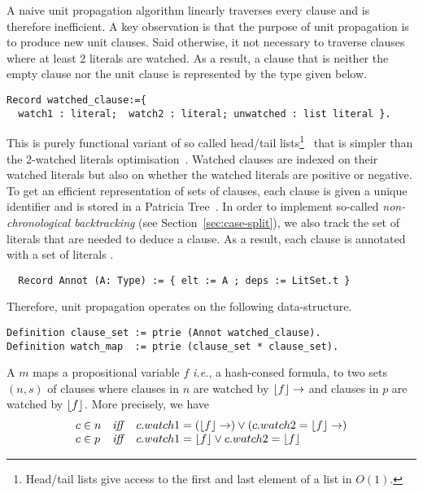 \documentclass[utf8,a4paper,UKenglish,cleveref, autoref, thm-restate]{lipics-v2021}
\begin{document}
A naive unit propagation algorithm linearly traverses every clause and is therefore inefficient.
%
A key observation is that the purpose of unit propagation is to
produce new unit clauses. Said otherwise, it not necessary to traverse
clauses where at least 2 literals are watched.
%
As a result, a clause that is neither the empty clause nor the unit clause is
represented by the type  given below.
\begin{verbatim}
Record watched_clause:={
  watch1 : literal;  watch2 : literal; unwatched : list literal }.
\end{verbatim}
This is purely functional variant  of so called head/tail
lists\footnote{Head/tail lists give access to the first and last element of a list in $O(1)$.}~\cite{Zhang96anefficient,ZhangS00} that is simpler than the
2-watched literals optimisation~\cite{MoskewiczMZZM01}.
%
Watched clauses are indexed on their watched literals but also on whether the watched literals are positive or negative.
%
To get an efficient representation of sets of clauses, each clause is
given a unique identifier and is stored in a Patricia
Tree~\cite{Okasaki98fastmergeable}.
%
In order to implement so-called \emph{non-chronological backtracking} (see Section~\ref{sec:case-split}),
we also track the set of literals that are needed to deduce a clause. As a
result, each clause is annotated  with a set of literals .
\begin{verbatim}
  Record Annot (A: Type) := { elt := A ; deps := LitSet.t }
\end{verbatim}
Therefore, unit propagation
operates on the following  data-structure.
\begin{verbatim}
Definition clause_set := ptrie (Annot watched_clause).
Definition watch_map  := ptrie (clause_set * clause_set).
\end{verbatim}
A  $m$ maps a propositional variable $f$ \emph{i.e.},
a hash-consed formula, to two sets $(n,s)$ of clauses where clauses in $n$ are watched by $\lfloor f \rfloor \to$ and clauses in $p$ 
are watched  by $\lfloor f \rfloor$. More precisely, we have
\[
  \begin{array}{lcl}
    c \in n &\mathit{ iff }& c.watch1=(\lfloor  f \rfloor \to) \lor (c.watch2=\lfloor f \rfloor \to) \\
    c \in p &\mathit{ iff }& c.watch1=\lfloor f \rfloor \lor c.watch2=\lfloor f \rfloor \\
  \end{array}
\]
\end{document}
